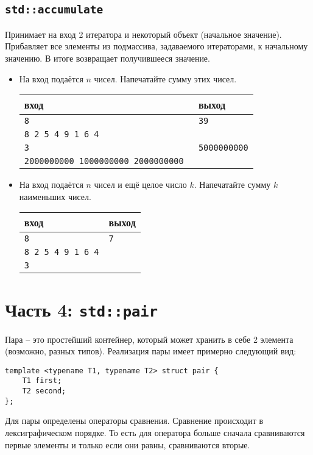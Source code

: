 \documentclass{article}
\begin{document}
\subsection*{\texttt{std::accumulate}}
Принимает на вход 2 итератора и некоторый объект (начальное значение). Прибавляет все элементы из подмассива, задаваемого итераторами, к начальному значению. В итоге возвращает получившееся значение.
\begin{itemize}
\item На вход подаётся $n$ чисел. Напечатайте сумму этих чисел.
\begin{center}
\begin{tabular}{ l | l }
 вход & выход \\ \hline
 \texttt{8} & \texttt{39}  \\ 
 \texttt{8 2 5 4 9 1 6 4} &  \\ \hline
 \texttt{3} & \texttt{5000000000}  \\ 
 \texttt{2000000000 1000000000 2000000000 } &  \\
\end{tabular}
\end{center}

\item На вход подаётся $n$ чисел и ещё целое число $k$. Напечатайте сумму $k$ наименьших чисел.
\begin{center}
\begin{tabular}{ l | l }
 вход & выход \\ \hline
 \texttt{8} & \texttt{7}  \\ 
 \texttt{8 2 5 4 9 1 6 4} &  \\
 \texttt{3} &\\
\end{tabular}
\end{center}
\end{itemize}

\newpage
\section*{Часть 4: \texttt{std::pair}}
Пара -- это простейший контейнер, который может хранить в себе 2 элемента (возможно, разных типов). Реализация пары имеет примерно следующий вид:
\begin{lstlisting}
template <typename T1, typename T2> struct pair {
    T1 first;
    T2 second;
};
\end{lstlisting}
Для пары определены операторы сравнения. Сравнение происходит в лексиграфическом порядке. То есть для оператора больше сначала сравниваются первые элементы и только если они равны, сравниваются вторые.\\
\end{document}
